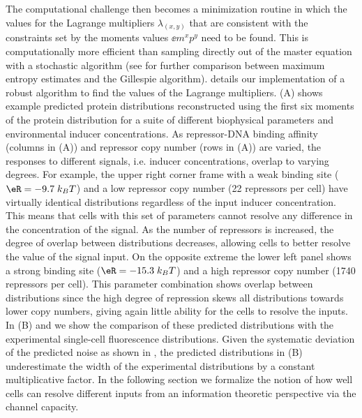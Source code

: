 The computational challenge then becomes a minimization routine in which the
values for the Lagrange multipliers $\lambda_{(x,y)}$ that are consistent with
the constraints set by the moments values $\ee{m^x p^y}$ need to be found. This
is computationally more efficient than sampling directly out of the master
equation with a stochastic algorithm (see  for further
comparison between maximum entropy estimates and the Gillespie algorithm).
 details our implementation of a robust algorithm to find
the values of the Lagrange multipliers. (A) shows example
predicted protein distributions reconstructed using the first six moments of
the protein distribution for a suite of different biophysical parameters and
environmental inducer concentrations. As repressor-DNA binding affinity
(columns in (A)) and repressor copy number (rows in
(A)) are varied, the responses to different signals, i.e.
inducer concentrations, overlap to varying degrees. For example, the upper
right corner frame with a weak binding site ($\eR = -9.7 \; k_BT$) and a low
repressor copy number (22 repressors per cell) have virtually identical
distributions regardless of the input inducer concentration. This means that
cells with this set of parameters cannot resolve any difference in the
concentration of the signal. As the number of repressors is increased, the
degree of overlap between distributions decreases, allowing cells to better
resolve the value of the signal input. On the opposite extreme the lower left
panel shows a strong binding site ($\eR = -15.3 \; k_BT$) and a high repressor
copy number (1740 repressors per cell). This parameter combination shows
overlap between distributions since the high degree of repression skews all
distributions towards lower copy numbers, giving again little ability for the
cells to resolve the inputs. In (B) and 
we show the comparison of these predicted distributions with the experimental
single-cell fluorescence distributions. Given the systematic deviation of the
predicted noise as shown in , the predicted distributions
in (B) underestimate the width of the experimental
distributions by a constant multiplicative factor. In the following section we
formalize the notion of how well cells can resolve different inputs from an
information theoretic perspective via the channel capacity.

